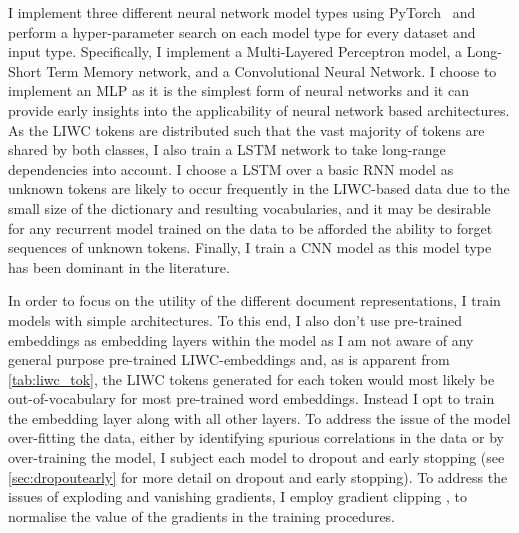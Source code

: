 I implement three different neural network model types using PyTorch~\citep{Paszke:2019} and perform a hyper-parameter search on each model type for every dataset and input type. Specifically, I implement a Multi-Layered Perceptron model, a Long-Short Term Memory network, and a Convolutional Neural Network.
I choose to implement an MLP as it is the simplest form of neural networks and it can provide early insights into the applicability of neural network based architectures.
As the LIWC tokens are distributed such that the vast majority of tokens are shared by both classes, I also train a LSTM network to take long-range dependencies into account. I choose a LSTM over a basic RNN model as unknown tokens are likely to occur frequently in the LIWC-based data due to the small size of the dictionary and resulting vocabularies, and it may be desirable for any recurrent model trained on the data to be afforded the ability to forget sequences of unknown tokens.
Finally, I train a CNN model as this model type has been dominant in the literature.

In order to focus on the utility of the different document representations, I train models with simple architectures. To this end, I also don't use pre-trained embeddings as embedding layers within the model as I am not aware of any general purpose pre-trained LIWC-embeddings and, as is apparent from \cref{tab:liwc_tok}, the LIWC tokens generated for each token would most likely be out-of-vocabulary for most pre-trained word embeddings. Instead I opt to train the embedding layer along with all other layers.
To address the issue of the model over-fitting the data, either by identifying spurious correlations in the data or by over-training the model, I subject each model to dropout and early stopping (see \cref{sec:dropoutearly} for more detail on dropout and early stopping). To address the issues of exploding and vanishing gradients, I employ gradient clipping \citep{Bengio:1994}, to normalise the value of the gradients in the training procedures.\vspace{5mm}

